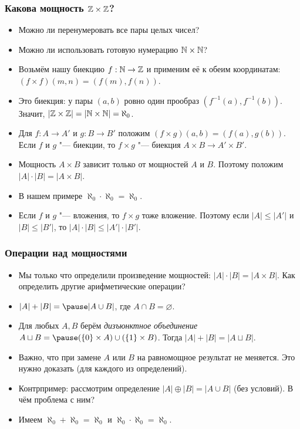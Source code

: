 \documentclass[10pt]{beamer}
\begin{document}
\begin{frame}
    \frametitle{Какова мощность $\mathbb{Z}\times\mathbb{Z}$?}
    \begin{itemize}
        \item Можно ли перенумеровать все пары целых чисел?
        \item<2-> Можно ли использовать готовую нумерацию $\mathbb{N}\times\mathbb{N}$?
        \item<3-> Возьмём нашу биекцию $f:\mathbb{N}\to\mathbb{Z}$ и применим её к обеим координатам: $(f\times f)(m,n)=(f(m),f(n))$.
        \item<4-> Это биекция: у пары $(a,b)$ ровно один прообраз $(f^{-1}(a),f^{-1}(b))$. Значит, $|\mathbb{Z}\times\mathbb{Z}|=|\mathbb{N}\times\mathbb{N}|=\aleph_0$.
        \item<5-> Для $f:A\to A'$ и $g:B\to B'$ положим $(f\times g)(a,b)=(f(a),g(b))$. Если $f$ и $g$ "--- биекции, то $f\times g$ "--- биекция $A\times B\to A'\times B'$.
        \item<6-> Мощность $A\times B$ зависит только от мощностей $A$ и $B$. Поэтому положим $|A|\cdot|B|=|A\times B|$.
        \item<7-> В нашем примере $\aleph_0\cdot\aleph_0=\aleph_0$.
        \item<8-> Если $f$ и $g$ "--- вложения, то $f\times g$ тоже вложение. Поэтому если $|A|\leq|A'|$ и $|B|\leq|B'|$, то $|A|\cdot|B|\leq|A'|\cdot|B'|$.
    \end{itemize}
\end{frame}

\begin{frame}
    \frametitle{Операции над мощностями}
    \begin{itemize}
        \item Мы только что определили произведение мощностей: $|A|\cdot|B|=|A\times B|$. Как определить другие арифметические операции?
        \pause
        \item $|A| + |B| = \pause |A \cup B|$, где $A \cap B = \varnothing$. \pause
        \item Для любых $A,B$ берём \emph{дизъюнктное объединение} $A\sqcup B=\pause(\{0\}\times A)\cup(\{1\}\times B)$. Тогда $|A|+|B|=|A\sqcup B|$.
        \pause
        \item Важно, что при замене $A$ или $B$ на равномощное результат не меняется. Это нужно доказать (для каждого из определений).
        \item Контрпример: рассмотрим определение $|A| \oplus |B| = |A \cup B|$ (без условий). В чём проблема с ним?
        \item Имеем $\aleph_0 + \aleph_0 = \aleph_0$ и $\aleph_0 \cdot \aleph_0 = \aleph_0$.
    \end{itemize}
\end{frame}
\end{document}
